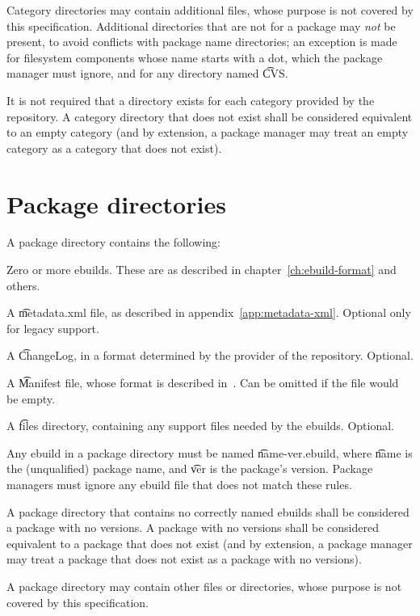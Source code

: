 Category directories may contain additional files, whose purpose is not covered by this
specification. Additional directories that are not for a package may \emph{not} be present, to avoid
conflicts with package name directories; an exception is made for filesystem components whose name
starts with a dot, which the package manager must ignore, and for any directory named \t{CVS}.

It is not required that a directory exists for each category provided by the repository. A category
directory that does not exist shall be considered equivalent to an empty category (and by extension,
a package manager may treat an empty category as a category that does not exist).

\section{Package directories}
\label{sec:package-dirs}

A package directory contains the following:
\nobreakpar
\begin{compactitem}
\item Zero or more ebuilds. These are as described in chapter~\ref{ch:ebuild-format} and others.
\item A \t{metadata.xml} file, as described in appendix~\ref{app:metadata-xml}\@. Optional only for
    legacy support.
\item A \t{ChangeLog}, in a format determined by the provider of the repository. Optional.
\item A \t{Manifest} file, whose format is described in~\cite{glep74}. Can be omitted if the file
    would be empty.
\item A \t{files} directory, containing any support files needed by the ebuilds. Optional.
\end{compactitem}

Any ebuild in a package directory must be named \t{name-ver.ebuild}, where \t{name} is the
(unqualified) package name, and \t{ver} is the package's version. Package managers must ignore
any ebuild file that does not match these rules.

A package directory that contains no correctly named ebuilds shall be considered a package with no
versions. A package with no versions shall be considered equivalent to a package that does not
exist (and by extension, a package manager may treat a package that does not exist as a package
with no versions).

A package directory may contain other files or directories, whose purpose is not covered by
this specification.

